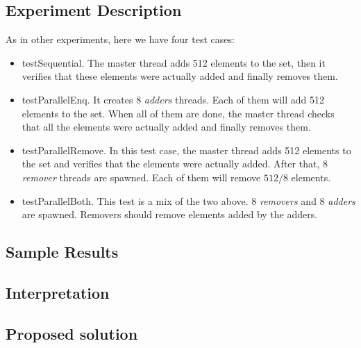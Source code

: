 \subsection{Experiment Description}
\par
As in other experiments, here we have four test cases:
\begin{itemize}
\item testSequential. The master thread adds 512 elements to the set, then it
verifies that these elements were actually added and finally removes them.
\item testParallelEnq. It creates 8 \textit{adders} threads. Each of them will
add 512 elements to the set. When all of them are done, the master thread
checks that all the elements were actually added and finally removes them.
\item testParallelRemove. In this test case, the master thread adds 512
elements to the set and verifies that the elements were actually added. After
that, 8 \textit{remover} threads are spawned. Each of them will remove $512/8$
elements. 
\item testParallelBoth. This test is a mix of the two above. 8
\textit{removers} and 8 \textit{adders} are spawned. Removers should remove
elements added by the adders.
\end{itemize}
\par
\subsection{Sample Results}
\par
\par
\subsection{Interpretation}
\par
\par
\subsection{Proposed solution}
\par
\par
